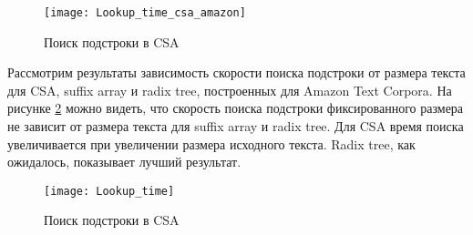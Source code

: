 \begin{figure}[h!]
	\centering
	\texttt{[image: Lookup\_time\_csa\_amazon]}
	\caption{Поиск подстроки в CSA}
	\label{fig:CSA_Lookup_time_csa_amazon}
\end{figure}

\clearpage
\newpage
Рассмотрим результаты зависимость скорости поиска подстроки от размера текста для CSA,
suffix array и radix tree, построенных для Amazon Text Corpora. На рисунке \ref{fig:CSA_Lookup_time}
можно видеть, что скорость поиска подстроки фиксированного размера не зависит от размера текста
для suffix array и radix tree. Для CSA время поиска увеличивается при увеличении размера исходного текста.
Radix tree, как ожидалось, показывает лучший результат.

\begin{figure}[h!]
	\centering
	\texttt{[image: Lookup\_time]}
	\caption{Поиск подстроки в CSA}
	\label{fig:CSA_Lookup_time}
\end{figure}

